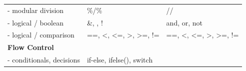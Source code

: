 \documentclass[]{book}
\theoremstyle{definition}
\theoremstyle{definition}
\theoremstyle{definition}
\theoremstyle{remark}
\begin{document}
\begin{longtable}[]{@{}lll@{}}
\begin{minipage}[t]{0.19\columnwidth}\raggedright\strut
- modular division\strut
\end{minipage} & \begin{minipage}[t]{0.33\columnwidth}\raggedright\strut
\%/\%\strut
\end{minipage} & \begin{minipage}[t]{0.39\columnwidth}\raggedright\strut
//\strut
\end{minipage}\tabularnewline
\begin{minipage}[t]{0.19\columnwidth}\raggedright\strut
- logical / boolean\strut
\end{minipage} & \begin{minipage}[t]{0.33\columnwidth}\raggedright\strut
\&, \textbar{}, !\strut
\end{minipage} & \begin{minipage}[t]{0.39\columnwidth}\raggedright\strut
and, or, not\strut
\end{minipage}\tabularnewline
\begin{minipage}[t]{0.19\columnwidth}\raggedright\strut
- logical / comparison\strut
\end{minipage} & \begin{minipage}[t]{0.33\columnwidth}\raggedright\strut
==, \textless{}, \textless{}=, \textgreater{}, \textgreater{}=, !=\strut
\end{minipage} & \begin{minipage}[t]{0.39\columnwidth}\raggedright\strut
==, \textless{}, \textless{}=, \textgreater{}, \textgreater{}=, !=\strut
\end{minipage}\tabularnewline
\begin{minipage}[t]{0.19\columnwidth}\raggedright\strut
\textbf{Flow Control}\strut
\end{minipage} & \begin{minipage}[t]{0.33\columnwidth}\raggedright\strut
\strut
\end{minipage} & \begin{minipage}[t]{0.39\columnwidth}\raggedright\strut
\strut
\end{minipage}\tabularnewline
\begin{minipage}[t]{0.19\columnwidth}\raggedright\strut
- conditionals, decisions\strut
\end{minipage} & \begin{minipage}[t]{0.33\columnwidth}\raggedright\strut
if-else, ifelse(), switch\strut
\end{minipage} & \begin{minipage}[t]{0.39\columnwidth}\raggedright\strut

\end{minipage}
\end{longtable}
\end{document}
